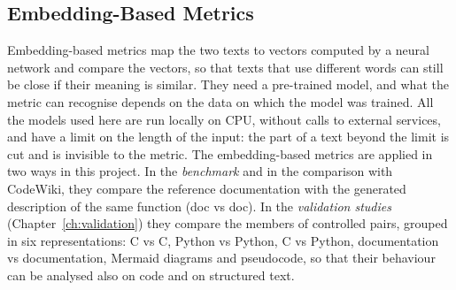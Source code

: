 \subsection{Embedding-Based Metrics}
\label{sec:m-embedding}
Embedding-based metrics map the two texts to vectors computed by a neural network and compare the
vectors, so that texts that use different words can still be close if their meaning is similar. They
need a pre-trained model, and what the metric can recognise depends on the data on which the model was
trained. All the models used here are run locally on CPU, without calls to external services, and
have a limit on the length of the input: the part of a text beyond the limit is cut and is invisible
to the metric. The embedding-based metrics are applied in two ways in this project. In the
\emph{benchmark} and in the comparison with CodeWiki, they compare the reference documentation with
the generated description of the same function (doc vs doc). In the \emph{validation studies}
(Chapter~\ref{ch:validation}) they compare the members of controlled pairs, grouped in six
representations: C vs C, Python vs Python, C vs Python, documentation vs documentation, Mermaid
diagrams and pseudocode, so that their behaviour can be analysed also on code and on structured
text.

